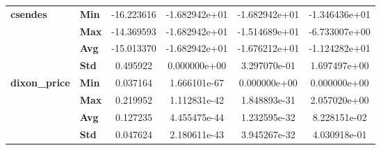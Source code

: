 \begin{longtable}{llcccc}
\cline{1-6}
\multirow{4}{*}{\textbf{csendes}} & \textbf{Min} &   -16.223616 &  -1.682942e+01 & -1.682942e+01 &  -1.346436e+01 \\
            & \textbf{Max} &   -14.369593 &  -1.682942e+01 & -1.514689e+01 &  -6.733007e+00 \\
            & \textbf{Avg} &   -15.013370 &  -1.682942e+01 & -1.676212e+01 &  -1.124282e+01 \\
            & \textbf{Std} &     0.495922 &   0.000000e+00 &  3.297070e-01 &   1.697497e+00 \\
\cline{1-6}
\multirow{4}{*}{\textbf{dixon_price}} & \textbf{Min} &     0.037164 &   1.666101e-67 &  0.000000e+00 &   0.000000e+00 \\
            & \textbf{Max} &     0.219952 &   1.112831e-42 &  1.848893e-31 &   2.057020e+00 \\
            & \textbf{Avg} &     0.127235 &   4.455475e-44 &  1.232595e-32 &   8.228151e-02 \\
            & \textbf{Std} &     0.047624 &   2.180611e-43 &  3.945267e-32 &   4.030918e-01 \\
\end{longtable}
